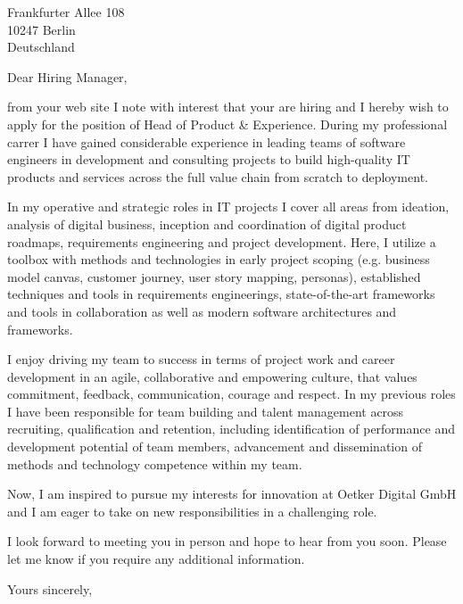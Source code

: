 \documentclass[10pt,a4paper]{dinbrief}
\date{\today}
\begin{document}
 
\begin{letter}  
{%
	Frankfurter Allee 108\\
	10247 Berlin\\
	Deutschland
}
\subject{\bf Job Application Head of Product \& Experience}
\opening{Dear Hiring Manager,}

from your web site I note with interest that your are  hiring and I hereby wish to apply for the position of Head of Product \& Experience. During my professional carrer I have gained considerable experience in leading teams of software engineers in development and consulting projects to build high-quality IT products and services across the full value chain from scratch to deployment. 

In my operative and strategic roles in IT projects I cover all areas from ideation, analysis of digital business, inception and coordination of digital product roadmaps, requirements engineering and project development. Here, I utilize a toolbox with methods and technologies in early project scoping (e.g. business model canvas, customer journey, user story mapping, personas), established techniques and tools in requirements engineerings, state-of-the-art frameworks and tools in collaboration as well as modern software architectures and frameworks.

I enjoy driving my team to success in terms of project work and career development in an agile, collaborative and empowering culture, that values commitment, feedback, communication, courage and respect. In my previous roles I have been responsible for team building and talent management across recruiting, qualification and retention, including identification of performance and development potential of team members, advancement and dissemination of methods and technology competence within my team.

Now, I am inspired to pursue my interests for innovation at Oetker Digital GmbH and I am eager to take on new responsibilities in a challenging role.

I look forward to meeting you in person and hope to hear from you soon. Please let me know if you require any additional information.

\closing{Yours sincerely,}
\end{letter}
\end{document}
